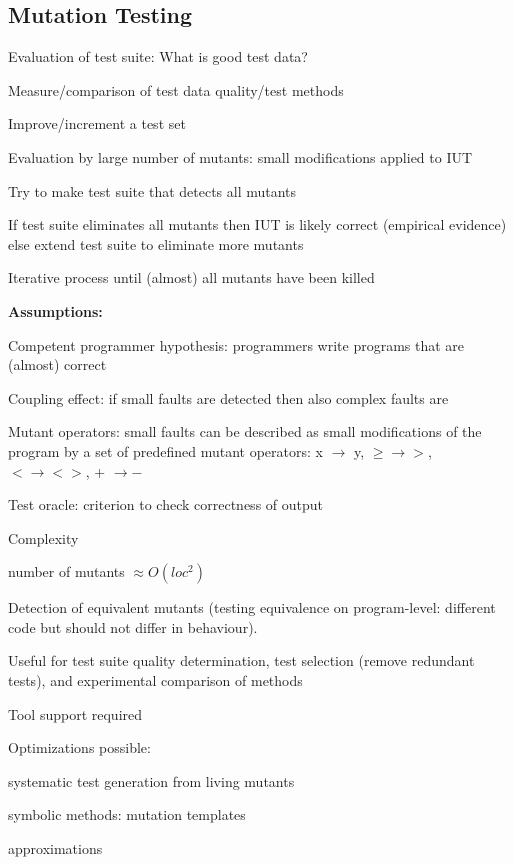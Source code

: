 \subsection{Mutation Testing}
\begin{itemize*}
\item Evaluation of test suite: What is good test data?
\item Measure/comparison of test data quality/test methods
\item Improve/increment a test set
\item Evaluation by large number of mutants: small modifications applied to IUT
\item Try to make test suite that detects all mutants
\item If test suite eliminates all mutants then IUT is likely correct (empirical evidence) else extend test suite to eliminate more mutants
\item Iterative process until (almost) all mutants have been killed
\end{itemize*}


\textbf{Assumptions:}
\begin{itemize*}
\item Competent programmer hypothesis: programmers write programs that are (almost) correct
\item Coupling effect: if small faults are detected then also complex faults are
\item Mutant operators: small faults can be described as small modifications of the program by a set of predefined mutant operators:
x $\rightarrow$ y,  $\geq \rightarrow > $, $ < \rightarrow <>$, + $\rightarrow -$
\item Test oracle: criterion to check correctness of output
\item Complexity
	\begin{itemize*}
		\item  number of mutants $\approx O(loc^2)$
	\end{itemize*}
\item Detection of equivalent mutants (testing equivalence on program-level: different code but should not differ in behaviour).
\item Useful for test suite quality determination, test selection (remove redundant tests), and experimental comparison of methods
\item Tool support required
\item Optimizations possible:
\begin{itemize*}
\item systematic test generation from living mutants
\item symbolic methods: mutation templates
\item approximations
\end{itemize*}
\end{itemize*}
